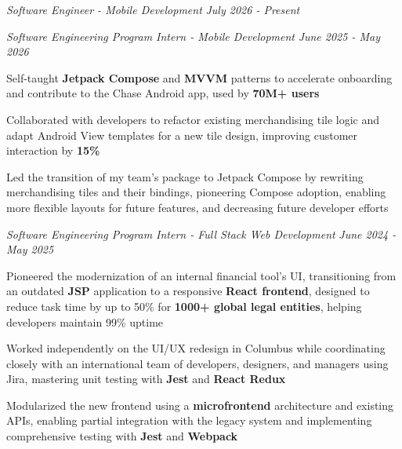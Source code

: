 \documentclass[letterpaper]{article}
\begin{document}
    \textit{Software Engineer - Mobile Development} \hfill \textsl{July 2026 - Present}\\
    \vspace{1mm}

    \textit{Software Engineering Program Intern - Mobile Development} \hfill \textsl{June 2025 - May 2026}\\
    \vspace{-7pt}
    \begin{tightitemize} \itemsep -1mm

            \item Self-taught \textbf{Jetpack Compose} and \textbf{MVVM} patterns to accelerate onboarding and contribute to the Chase Android app, used by \textbf{70M+ users}
            
            \item Collaborated with developers to refactor existing merchandising tile logic and adapt Android View templates for a new tile design, improving customer interaction by \textbf{15\%}
            
            \item Led the transition of my team's package to Jetpack Compose by rewriting merchandising tiles and their bindings, pioneering Compose adoption, enabling more flexible layouts for future features, and decreasing future developer efforts
                    
    \end{tightitemize}
    \textit{Software Engineering Program Intern - Full Stack Web Development} \hfill \textsl{June 2024 - May 2025}\\
    \vspace{-7pt}
    \begin{tightitemize} \itemsep -1mm

            \item Pioneered the modernization of an internal financial tool's UI, transitioning from an outdated \textbf{JSP} application to a responsive \textbf{React frontend}, designed to reduce task time by up to 50\% for \textbf{1000+ global legal entities}, helping developers maintain 99\% uptime

            \item Worked independently on the UI/UX redesign in Columbus while coordinating closely with an international team of developers, designers, and managers using Jira, mastering unit testing with \textbf{Jest} and \textbf{React Redux}

            \item Modularized the new frontend using a \textbf{microfrontend} architecture and existing APIs, enabling partial integration with the legacy system and implementing comprehensive testing with \textbf{Jest} and \textbf{Webpack}
                    
    \end{tightitemize}
    \vspace{-2mm}
\end{document}
